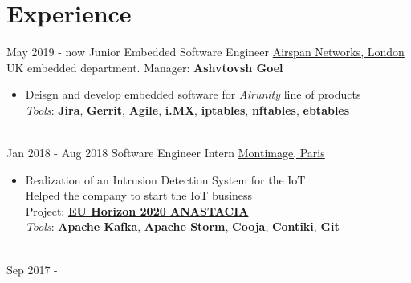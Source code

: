 \documentclass[letterpaper]{twentysecondcv} %
\begin{document}
\makeprofile %


\section{Experience}

\begin{twenty} %
    \twentyitem
    	{May 2019 -}
		{now}
        {Junior Embedded Software Engineer}
        {\href{https://www.airspan.com/}{Airspan Networks, London}}
        {UK embedded department. Manager: \textbf{Ashvtovsh Goel}}
        {
            \begin{itemize}
                \item Deisgn and develop embedded software for \textit{Airunity} line of products\\
                \textit{Tools}: \textbf{Jira}, \textbf{Gerrit}, \textbf{Agile}, \textbf{i.MX}, \textbf{iptables}, \textbf{nftables}, \textbf{ebtables} 
            \end{itemize}
        }\\
\twentyitem
    	{Jan 2018 -}
		{Aug 2018}
        {Software Engineer Intern}
        {\href{https://www.montimage.com/}{Montimage, Paris}}
        {}
        {
            \begin{itemize}
                \item Realization of an Intrusion Detection System for the IoT\\
                Helped the company to start the IoT business\\
                Project: \href{http://www.anastacia-h2020.eu/}{\textbf{EU Horizon 2020 ANASTACIA}}\\
                \textit{Tools}: \textbf{Apache Kafka}, \textbf{Apache Storm}, \textbf{Cooja}, \textbf{Contiki}, \textbf{Git}
            \end{itemize}
        }\\
    \twentyitem
   		{Sep 2017 -}

\end{twenty}
\end{document}
